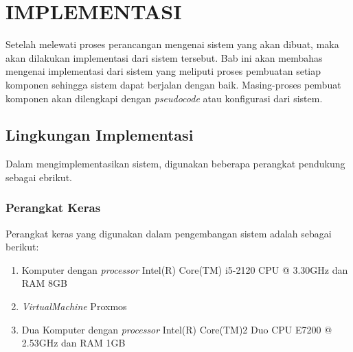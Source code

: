 \chapter{IMPLEMENTASI}
Setelah melewati proses perancangan mengenai sistem yang akan dibuat, maka akan dilakukan implementasi dari sistem tersebut. Bab ini akan membahas mengenai implementasi dari sistem yang meliputi proses pembuatan setiap komponen sehingga sistem dapat berjalan dengan baik. Masing-proses pembuat komponen akan dilengkapi dengan \textit{pseudocode} atau konfigurasi dari sistem.  
\section{Lingkungan Implementasi}
  	Dalam mengimplementasikan sistem, digunakan beberapa perangkat pendukung sebagai ebrikut.
    \subsection{Perangkat Keras}
    Perangkat keras yang digunakan dalam pengembangan sistem adalah sebagai berikut:
    \begin{enumerate}
    \item Komputer dengan \textit{processor} Intel(R) Core(TM) i5-2120 CPU @ 3.30GHz dan RAM 8GB
    \item \textit{VirtualMachine} Proxmos
    \item Dua Komputer dengan \textit{processor} Intel(R) Core(TM)2 Duo CPU E7200 @ 2.53GHz dan RAM 1GB
    \end{enumerate}
